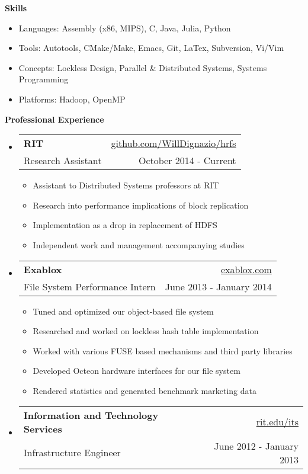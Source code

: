 \documentclass[letterpaper,11pt]{article}
\makeatletter
\newcommand{\resheading}[1]{{\large \colorbox{mygrey}{\begin{minipage}{\textwidth}{\textbf{#1 \vphantom{p\^{E}}}}\end{minipage}}}}
\newcommand{\ressubheading}[4]{
\begin{tabular*}{6.5in}{l@{\extracolsep{\fill}}r}
		\textbf{#1} & #2 \\
		{#3} & {#4} \\
\end{tabular*}\vspace{-6pt}}
\makeatother
\begin{document}
\resheading{{Skills}}
{ \footnotesize
		\begin{itemize}
			\item{Languages: Assembly (x86, MIPS), C, Java, Julia, Python}
			\item{Tools: Autotools, CMake/Make, Emacs, Git, LaTex, Subversion, Vi/Vim}
			\item{Concepts: Lockless Design, Parallel \& Distributed Systems, Systems Programming}
			\item{Platforms: Hadoop, OpenMP}
		\end{itemize}
}
\resheading{Professional Experience}
{\footnotesize
	\begin{itemize}
			\item
			\ressubheading{RIT}{\href{https://www.github.com/WillDignazio/hrfs}{github.com/WillDignazio/hrfs}}{Research Assistant}{October 2014 - Current}
			{ \footnotesize
				\begin{itemize}
					\item{Assistant to Distributed Systems professors at RIT}
					\item{Research into performance implications of block replication}
					\item{Implementation as a drop in replacement of HDFS}
					\item{Independent work and management accompanying studies}
				\end{itemize}
			}
			\item
			\ressubheading{Exablox}{\href{http://www.exablox.com/}{exablox.com}}{File System Performance Intern}{June 2013 - January 2014}
			{ \footnotesize
				\begin{itemize}
					\item{Tuned and optimized our object-based file system}
					\item{Researched and worked on lockless hash table implementation}
					\item{Worked with various FUSE based mechanisms and third party libraries}
					\item{Developed Octeon hardware interfaces for our file system}
					\item{Rendered statistics and generated benchmark marketing data}
				\end{itemize}
			}
			\item 
			\ressubheading{Information and Technology Services}{\href{http://www.rit.edu/its/}{rit.edu/its}}{Infrastructure Engineer}{June 2012 - January 2013}
			{ \footnotesize
				\begin{itemize}

\end{itemize}}
\end{itemize}}
\end{document}
